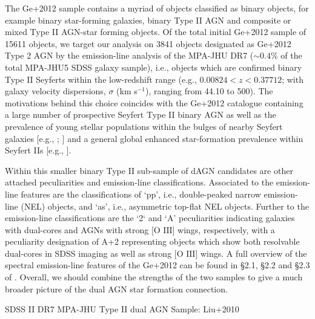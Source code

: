 The Ge+2012 sample contains a myriad of objects classified as binary objects, for example binary star-forming galaxies, binary Type II AGN and composite or mixed Type II AGN-star forming objects. Of the total initial Ge+2012 sample of 15611 objects, we target our analysis on 3841 objects designated as Ge+2012 Type 2 AGN by the emission-line analysis of the MPA-JHU DR7 ($\sim{0.4}$\% of the total MPA-JHU5 SDSS galaxy sample), i.e., objects which are confirmed binary Type II Seyferts within the low-redshift range (e.g., ${0.00824}<{z}<{0.37712}$; with galaxy velocity dispersions, $\sigma$ (km s$^{-1}$), ranging from 44.10 to 500). The motivations behind this choice coincides with the Ge+2012 catalogue containing a large number of prospective Seyfert Type II binary AGN as well as the prevalence of young stellar populations within the bulges of nearby Seyfert galaxies [e.g., \cite{1990MNRAS.242..271T}; \cite{Delgado_2001}] and a general global enhanced star-formation prevalence within Seyfert IIs [e.g., \cite{2006MNRAS.366..480G}].  

Within this smaller binary Type II sub-sample of dAGN candidates are other attached peculiarities and emission-line classifications. Associated to the emission-line features are the classifications of `pp', i.e., double-peaked narrow emission-line (NEL) objects, and `as', i.e., asymmetric top-flat NEL objects. Further to the emission-line classifications are the `2` and `A' peculiarities indicating galaxies with dual-cores and AGNs with strong $\text{[O III]}$ wings, respectively, with a peculiarity designation of A+2 representing objects which show both resolvable dual-cores in SDSS imaging as well as strong $\text{[O III]}$ wings. A full overview of the spectral emission-line features of the Ge+2012 can be found in §2.1, §2.2 and §2.3 of \cite{Ge_Hu_Wang_Bai_Zhang_2012}. Overall, we should combine the strengths of the two samples to give a much broader picture of the dual AGN star formation connection.

SDSS II DR7 MPA-JHU Type II dual AGN Sample: Liu+2010

